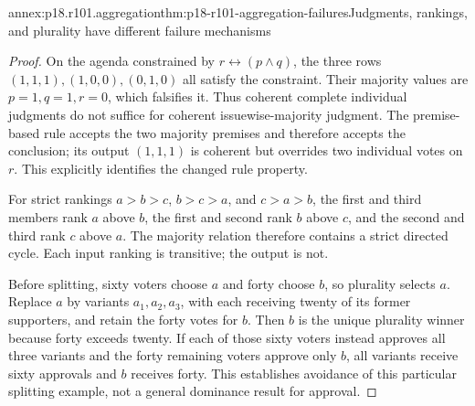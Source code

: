 \begin{annexitem}{annex:p18.r101.aggregation}{thm:p18-r101-aggregation-failures}{Judgments, rankings, and plurality have different failure mechanisms}
\begin{proof}
On the agenda constrained by \(r\leftrightarrow(p\land q)\), the
three rows \((1,1,1),(1,0,0),(0,1,0)\) all satisfy the constraint.
Their majority values are \(p=1,q=1,r=0\), which falsifies it.
Thus coherent complete individual judgments do not suffice for
coherent issuewise-majority judgment. The premise-based rule accepts
the two majority premises and therefore accepts the conclusion; its
output \((1,1,1)\) is coherent but overrides two individual votes on
\(r\). This explicitly identifies the changed rule property.

For strict rankings \(a>b>c\), \(b>c>a\), and \(c>a>b\), the first
and third members rank \(a\) above \(b\), the first and second rank
\(b\) above \(c\), and the second and third rank \(c\) above \(a\).
The majority relation therefore contains a strict directed cycle. Each
input ranking is transitive; the output is not.

Before splitting, sixty voters choose \(a\) and forty choose \(b\),
so plurality selects \(a\). Replace \(a\) by variants
\(a_1,a_2,a_3\), with each receiving twenty of its former supporters,
and retain the forty votes for \(b\). Then \(b\) is the unique
plurality winner because forty exceeds twenty. If each of those sixty
voters instead approves all three variants and the forty remaining
voters approve only \(b\), all variants receive sixty approvals and
\(b\) receives forty. This establishes avoidance of this particular
splitting example, not a general dominance result for approval.
\end{proof}
\end{annexitem}

